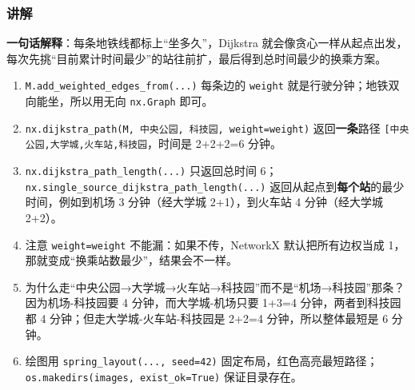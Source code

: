 \begin{Shaded}
\begin{Highlighting}[]
\end{Highlighting}
\end{Shaded}

\subsubsection{讲解}\label{ux8bb2ux89e3-25}

\textbf{一句话解释}：每条地铁线都标上``坐多久''，Dijkstra
就会像贪心一样从起点出发，每次先挑``目前累计时间最少''的站往前扩，最后得到总时间最少的换乘方案。

\begin{enumerate}
\def\labelenumi{\arabic{enumi}.}
\tightlist
\item
  \texttt{M.add\_weighted\_edges\_from(...)} 每条边的 \texttt{weight}
  就是行驶分钟；地铁双向能坐，所以用无向 \texttt{nx.Graph} 即可。
\item
  \texttt{nx.dijkstra\_path(M,\ \textquotesingle{}中央公园\textquotesingle{},\ \textquotesingle{}科技园\textquotesingle{},\ weight=\textquotesingle{}weight\textquotesingle{})}
  返回\textbf{一条}路径
  \texttt{{[}\textquotesingle{}中央公园\textquotesingle{},\textquotesingle{}大学城\textquotesingle{},\textquotesingle{}火车站\textquotesingle{},\textquotesingle{}科技园\textquotesingle{}{]}}，时间是
  2+2+2=6 分钟。
\item
  \texttt{nx.dijkstra\_path\_length(...)} 只返回总时间
  6；\texttt{nx.single\_source\_dijkstra\_path\_length(...)}
  返回从起点到\textbf{每个站}的最少时间，例如到机场 3 分钟（经大学城
  2+1），到火车站 4 分钟（经大学城 2+2）。
\item
  注意 \texttt{weight=\textquotesingle{}weight\textquotesingle{}}
  不能漏：如果不传，NetworkX 默认把所有边权当成
  1，那就变成``换乘站数最少''，结果会不一样。
\item
  为什么走``中央公园→大学城→火车站→科技园''而不是``机场→科技园''那条？因为机场-科技园要
  4 分钟，而大学城-机场只要 1+3=4 分钟，两者到科技园都 4
  分钟；但走大学城-火车站-科技园是 2+2=4 分钟，所以整体最短是 6 分钟。
\item
  绘图用 \texttt{spring\_layout(...,\ seed=42)}
  固定布局，红色高亮最短路径；\texttt{os.makedirs(\textquotesingle{}images\textquotesingle{},\ exist\_ok=True)}
  保证目录存在。
\end{enumerate}

